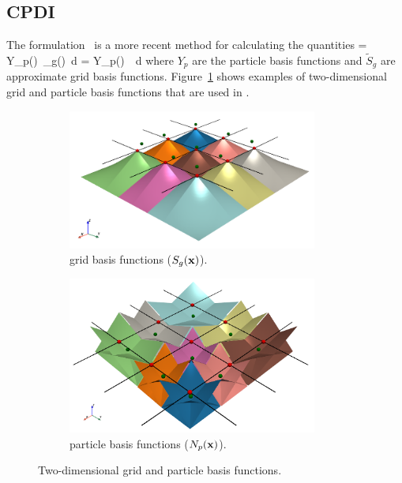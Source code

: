 \subsection{CPDI}
The \CPDI formulation~\cite{Sadeghirad2011} is a more recent method for calculating  
the quantities
\Beq \label{eq:cpdi_int}
    =  \IntOmegap Y_p(\Bx)~_g(\Bx)~d\Omega 
   \quad \Tand \quad
    =  \IntOmegap Y_p(\Bx)~~d\Omega 
\Eeq
where $Y_p$ are the particle basis functions and $\tilde{S}_g$ are approximate
grid basis functions.  Figure~\ref{fig:CPDI} shows examples of two-dimensional grid and 
particle basis functions that are used in \CPDI.
\begin{figure}[htbp!]
  \begin{subfigure}[t]{0.5\textwidth}
    \centering
    \includegraphics[width=0.9\textwidth]{Figs/mpm_basis/cpdi_grid_basis.png}
    \caption{\CPDI grid basis functions ($S_g(\mathbf{x})$).}
  \end{subfigure}
  \begin{subfigure}[t]{0.5\textwidth}
    \centering
    \includegraphics[width=0.9\textwidth]{Figs/mpm_basis/cpdi_particle_basis.png}
    \caption{\CPDI particle basis functions ($N_p(\mathbf{x})$).}
  \end{subfigure}
  \caption{Two-dimensional \CPDI grid and particle basis functions.} 
  \label{fig:CPDI}
\end{figure}

